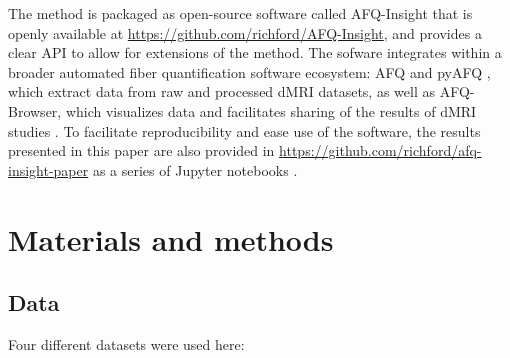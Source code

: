 \documentclass[10pt,letterpaper]{article}
\begin{document}
The method is packaged as open-source software called AFQ-Insight that is
openly available at \url{https://github.com/richford/AFQ-Insight}, and
provides a clear API to allow for extensions of the method. The sofware
integrates within a broader automated fiber quantification software
ecosystem: AFQ \cite{yeatman2012tract} and pyAFQ \cite{kruper2021evaluating}, which extract
 data from raw and processed dMRI datasets, as well as
AFQ-Browser, which visualizes  data and facilitates sharing of the
results of dMRI studies \cite{yeatman2018browser}. To facilitate
reproducibility and ease use of the software, the results presented in this
paper are also provided in
\url{https://github.com/richford/afq-insight-paper} as a series of Jupyter
notebooks \cite{kluyver2016jupyter}.

\section*{Materials and methods}
\label{sec:methods}

\subsection*{Data}
\label{sec:data}

Four different datasets were used here:
\end{document}

